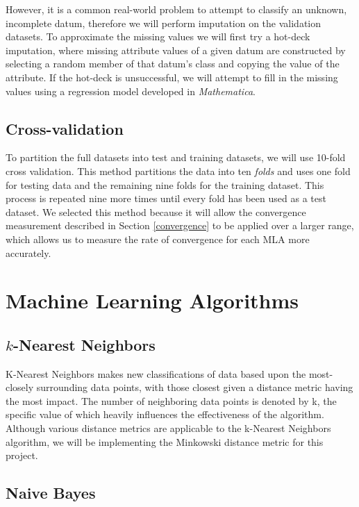 \documentclass{article}
\begin{document}
			However, it is a common real-world problem to attempt to classify an unknown, incomplete datum, therefore we will perform imputation on the validation datasets. 
			To approximate the missing values we will first try a hot-deck imputation, where missing attribute values of a given datum are constructed by selecting a random member of that datum's class and copying the value of the attribute. 
			If the hot-deck is unsuccessful, we will attempt to fill in the missing values using a regression model developed in \textit{Mathematica}.
		\subsection{Cross-validation}
			\label{cv}
			To partition the full datasets into test and training datasets, we will use 10-fold cross validation. 
			This method partitions the data into ten \textit{folds} and uses one fold for testing data and the remaining nine folds for the training dataset. 
			This process is repeated nine more times until every fold has been used as a test dataset. 
			We selected this method because it will allow the convergence measurement described in Section \ref{convergence} to be applied over a larger range, which allows us to measure the rate of convergence for each MLA more accurately.
	\section{Machine Learning Algorithms}
		\label{mla}
		\subsection{$k$-Nearest Neighbors}
			K-Nearest Neighbors makes new classifications of data based upon the most-closely surrounding data points, with those closest given a distance metric having the most impact.  
			The number of neighboring data points is denoted by k, the specific value of which heavily influences the effectiveness of the algorithm.  
			Although various distance metrics are applicable to the k-Nearest Neighbors algorithm, we will be implementing the Minkowski distance metric for this project.
		\subsection{Naive Bayes}
			\label{nbw}
\end{document}
